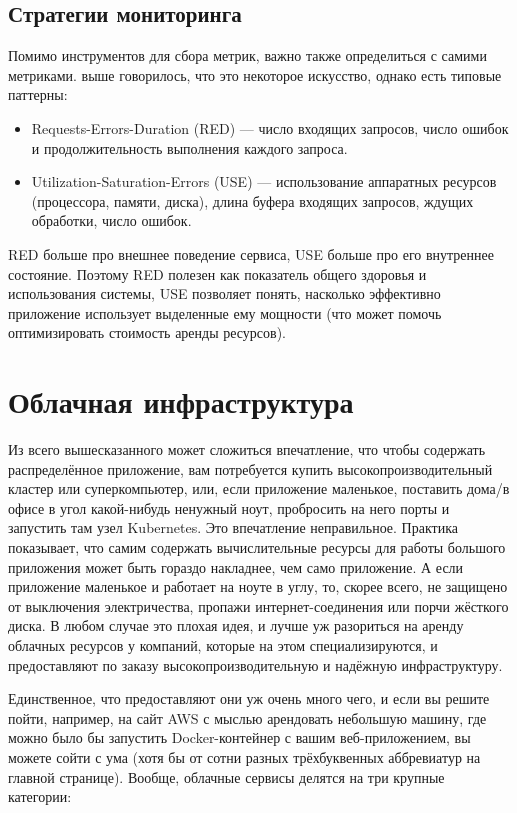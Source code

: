 \documentclass[a5paper]{article}
\begin{document}
\subsection{Стратегии мониторинга}

Помимо инструментов для сбора метрик, важно также определиться с самими метриками. выше говорилось, что это некоторое искусство, однако есть типовые паттерны:

\begin{itemize}
    \item Requests-Errors-Duration (RED) --- число входящих запросов, число ошибок и продолжительность выполнения каждого запроса.
    \item Utilization-Saturation-Errors (USE) --- использование аппаратных ресурсов (процессора, памяти, диска), длина буфера входящих запросов, ждущих обработки, число ошибок.
\end{itemize}

RED больше про внешнее поведение сервиса, USE больше про его внутреннее состояние. Поэтому RED полезен как показатель общего здоровья и использования системы, USE позволяет понять, насколько эффективно приложение использует выделенные ему мощности (что может помочь оптимизировать стоимость аренды ресурсов).

\section{Облачная инфраструктура}

Из всего вышесказанного может сложиться впечатление, что чтобы содержать распределённое приложение, вам потребуется купить высокопроизводительный кластер или суперкомпьютер, или, если приложение маленькое, поставить дома/в офисе в угол какой-нибудь ненужный ноут, пробросить на него порты и запустить там узел Kubernetes. Это впечатление неправильное. Практика показывает, что самим содержать вычислительные ресурсы для работы большого приложения может быть гораздо накладнее, чем само приложение. А если приложение маленькое и работает на ноуте в углу, то, скорее всего, не защищено от выключения электричества, пропажи интернет-соединения или порчи жёсткого диска. В любом случае это плохая идея, и лучше уж разориться на аренду облачных ресурсов у компаний, которые на этом специализируются, и предоставляют по заказу высокопроизводительную и надёжную инфраструктуру.

Единственное, что предоставляют они уж очень много чего, и если вы решите пойти, например, на сайт AWS с мыслью арендовать небольшую машину, где можно было бы запустить Docker-контейнер с вашим веб-приложением, вы можете сойти с ума (хотя бы от сотни разных трёхбуквенных аббревиатур на главной странице). Вообще, облачные сервисы делятся на три крупные категории:
\end{document}
